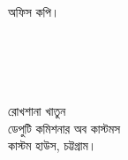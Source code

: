 \documentclass[12pt]{article}
\begin{document}
\begin{minipage}[t]{0.94\linewidth}
 অফিস কপি।
 \\
 \\
 \\
 \\
 \\
\end{minipage}
\begin{minipage}[t]{0.60\linewidth}
\hspace{1em}
\end{minipage}
\normalsize
\begin{minipage}[t]{0.40\linewidth}
\begin{center}
রোখশানা খাতুন
\\
ডেপুটি কমিশনার অব কাস্টমস
\\
কাস্টম হাউস, চট্টগ্রাম।
\end{center}
\end{minipage}
\thispagestyle{slogan}
\end{document}

